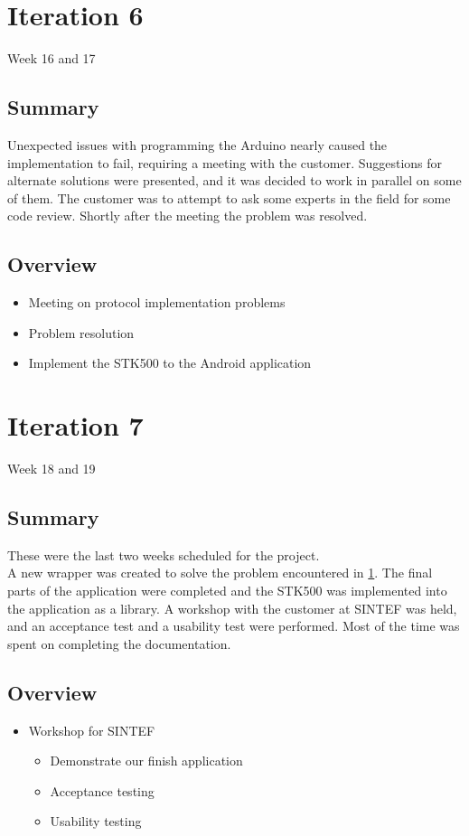 \section{Iteration 6}\label{iteration6}
Week 16 and 17

\subsection{Summary}
	Unexpected issues with programming the Arduino nearly caused the implementation to fail, requiring a meeting with the customer.
Suggestions for alternate solutions were presented, and it was decided to work in parallel on some of them. The customer was to attempt to ask some experts in the field for some code review.
Shortly after the meeting the problem was resolved.

\subsection{Overview}
\begin{itemize}
    \item{Meeting on protocol implementation problems}
    \item{Problem resolution}
	\item{Implement the STK500 to the Android application}
\end{itemize}

\section{Iteration 7}
Week 18 and 19

\subsection{Summary}
These were the last two weeks scheduled for the project.\\
A new wrapper was created to solve the problem encountered in \ref{iteration6}.
The final parts of the application were completed and the STK500 was implemented into the application as a library.
	A workshop with the customer at SINTEF was held, and an acceptance test and a usability test were performed. Most of the time was spent on completing the documentation.

\subsection{Overview}
\begin{itemize}
	\item{Workshop for SINTEF}
		\begin{itemize}
			\item{Demonstrate our finish application}
			\item{Acceptance testing}
			\item{Usability testing}
		\end{itemize}
\end{itemize}
